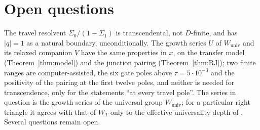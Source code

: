 \documentclass[11pt]{article}
\theoremstyle{plain}
\theoremstyle{definition}
\theoremstyle{remark}
\theoremstyle{plain}\newtheorem*{maintheorem}{Main Theorem}
\begin{document}
\section{Open questions}\label{sec:conclusion}

The travel resolvent $\Sigma_0/(1-\Sigma_1)$ is transcendental, not $D$-finite, and has $|q|=1$ as a
natural boundary, unconditionally. The growth series $U$ of $W_{\mathrm{univ}}$ and its relaxed
companion $V$ have the same properties in $x$, on the transfer model (Theorem~\ref{thm:model}) and
the junction pairing (Theorem~\ref{thm:RJ}); two finite ranges are computer-assisted, the six gate
poles above $\tau=5\cdot10^{-3}$ and the positivity of the pairing at the first twelve poles, and
neither is needed for transcendence, only for the statements ``at every travel pole''. The series
in question is the growth series of the universal group $W_{\mathrm{univ}}$; for a particular right
triangle it agrees with that of $W_T$ only to the effective universality depth of
\cite{Bonfioli2026a}. Several questions remain open.
\end{document}
